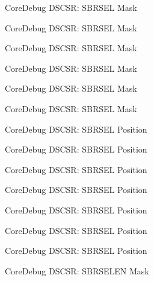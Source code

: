 \begin{DoxyRefList}
\label{deprecated__deprecated000150}%
%
Core\+Debug D\+S\+C\+SR\+: S\+B\+R\+S\+EL Mask 

\label{deprecated__deprecated000226}%
%
Core\+Debug D\+S\+C\+SR\+: S\+B\+R\+S\+EL Mask 

\label{deprecated__deprecated000289}%
%
Core\+Debug D\+S\+C\+SR\+: S\+B\+R\+S\+EL Mask 

\label{deprecated__deprecated000368}%
%
Core\+Debug D\+S\+C\+SR\+: S\+B\+R\+S\+EL Mask 

\label{deprecated__deprecated000444}%
%
Core\+Debug D\+S\+C\+SR\+: S\+B\+R\+S\+EL Mask 

\label{deprecated__deprecated000547}%
%
Core\+Debug D\+S\+C\+SR\+: S\+B\+R\+S\+EL Mask  
\item[Member \mbox{\hyperlink{group__CMSIS__CoreDebug_ga7450603163415ab4d4e4a7a767879eae}{Core\+Debug\+\_\+\+D\+S\+C\+S\+R\+\_\+\+S\+B\+R\+S\+E\+L\+\_\+\+Pos}} ]\label{deprecated__deprecated000095}%
%
Core\+Debug D\+S\+C\+SR\+: S\+B\+R\+S\+EL Position 

\label{deprecated__deprecated000149}%
%
Core\+Debug D\+S\+C\+SR\+: S\+B\+R\+S\+EL Position 

\label{deprecated__deprecated000225}%
%
Core\+Debug D\+S\+C\+SR\+: S\+B\+R\+S\+EL Position 

\label{deprecated__deprecated000288}%
%
Core\+Debug D\+S\+C\+SR\+: S\+B\+R\+S\+EL Position 

\label{deprecated__deprecated000367}%
%
Core\+Debug D\+S\+C\+SR\+: S\+B\+R\+S\+EL Position 

\label{deprecated__deprecated000443}%
%
Core\+Debug D\+S\+C\+SR\+: S\+B\+R\+S\+EL Position 

\label{deprecated__deprecated000546}%
%
Core\+Debug D\+S\+C\+SR\+: S\+B\+R\+S\+EL Position  
\item[Member \mbox{\hyperlink{group__CMSIS__CoreDebug_ga5e5ed94cac1139165af161c008881805}{Core\+Debug\+\_\+\+D\+S\+C\+S\+R\+\_\+\+S\+B\+R\+S\+E\+L\+E\+N\+\_\+\+Msk}} ]\label{deprecated__deprecated000098}%
%
Core\+Debug D\+S\+C\+SR\+: S\+B\+R\+S\+E\+L\+EN Mask 


\end{DoxyRefList}
